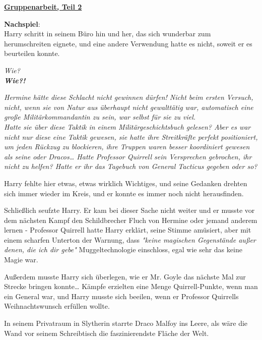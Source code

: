 

\hypertarget{gruppenarbeit-teil-2}{%

\textbf{\uline{Gruppenarbeit, Teil 2}}

\textbf{Nachspiel}:\\ Harry schritt in seinem Büro hin und her, das sich wunderbar zum herumschreiten eignete, und eine andere Verwendung hatte es nicht, soweit er es beurteilen konnte.

\emph{Wie?}\\ \textbf{\emph{Wie?!}}

\emph{Hermine hätte diese Schlacht nicht gewinnen dürfen! Nicht beim ersten Versuch, nicht, wenn sie von Natur aus überhaupt nicht gewalttätig war, automatisch eine große Militärkommandantin zu sein, war selbst für sie zu viel.}\\ \emph{\hfill\break Hatte sie über diese Taktik in einem Militärgeschichtsbuch gelesen? Aber es war nicht nur diese eine Taktik gewesen, sie hatte ihre Streitkräfte perfekt positioniert, um jeden Rückzug zu blockieren, ihre Truppen waren besser koordiniert gewesen als seine oder Dracos… Hatte Professor Quirrell sein Versprechen gebrochen, ihr nicht zu helfen? Hatte er ihr das Tagebuch von General Tacticus gegeben oder so?}

Harry fehlte hier etwas, etwas wirklich Wichtiges, und seine Gedanken drehten sich immer wieder im Kreis, und er konnte es immer noch nicht herausfinden.

Schließlich seufzte Harry. Er kam bei dieser Sache nicht weiter und er musste vor dem nächsten Kampf den Schildbrecher Fluch von Hermine oder jemand anderem lernen - Professor Quirrell hatte Harry erklärt, seine Stimme amüsiert, aber mit einem scharfen Unterton der Warnung, dass \emph{"keine magischen Gegenstände außer denen, die ich dir gebe"} Muggeltechnologie einschloss, egal wie sehr das keine Magie war.

Außerdem musste Harry sich überlegen, wie er Mr. Goyle das nächste Mal zur Strecke bringen konnte… Kämpfe erzielten eine Menge Quirrell-Punkte, wenn man ein General war, und Harry musste sich beeilen, wenn er Professor Quirrells Weihnachtswunsch erfüllen wollte.

In seinem Privatraum in Slytherin starrte Draco Malfoy ins Leere, als wäre die Wand vor seinem Schreibtisch die faszinierendste Fläche der Welt.

}
